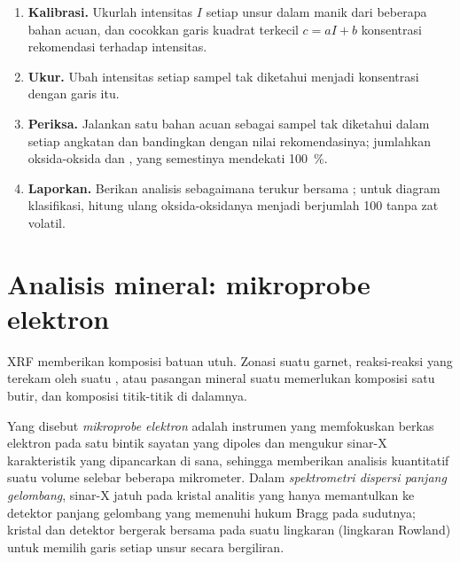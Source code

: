\begin{method}\label{met:b2:field-lab-methods-2:calibration}
\begin{enumerate}
  \item \textbf{Kalibrasi.} Ukurlah intensitas $I$ setiap unsur dalam manik dari beberapa bahan
        acuan, dan cocokkan garis kuadrat terkecil $c = aI + b$ konsentrasi rekomendasi
        terhadap intensitas.
  \item \textbf{Ukur.} Ubah intensitas setiap sampel tak diketahui menjadi konsentrasi dengan garis itu.
  \item \textbf{Periksa.} Jalankan satu bahan acuan sebagai sampel tak diketahui dalam setiap angkatan dan bandingkan dengan
        nilai rekomendasinya; jumlahkan oksida-oksida dan , yang semestinya mendekati
        \qty{100}{\percent}.
  \item \textbf{Laporkan.} Berikan analisis sebagaimana terukur bersama ; untuk
        diagram klasifikasi, hitung ulang oksida-oksidanya menjadi berjumlah 100 tanpa zat volatil.
\end{enumerate}
\end{method}

\section{Analisis mineral: mikroprobe elektron}\label{sec:b2:field-lab-methods-2:microprobe}

XRF memberikan komposisi batuan utuh. Zonasi suatu  garnet, reaksi-reaksi
yang terekam oleh suatu , atau pasangan mineral suatu  memerlukan komposisi satu
butir, dan komposisi titik-titik di dalamnya.

\begin{definition}\label{def:b2:field-lab-methods-2:epma}
Yang disebut \emph{mikroprobe elektron} adalah instrumen yang memfokuskan berkas
elektron pada satu bintik sayatan yang dipoles dan mengukur sinar-X karakteristik yang dipancarkan di sana,
sehingga memberikan analisis kuantitatif suatu volume selebar beberapa mikrometer. Dalam
\emph{spektrometri dispersi panjang gelombang}, sinar-X jatuh
pada kristal analitis yang hanya memantulkan ke detektor panjang gelombang yang memenuhi hukum Bragg pada
sudutnya; kristal dan detektor bergerak bersama pada suatu lingkaran (lingkaran Rowland) untuk memilih garis
setiap unsur secara bergiliran.
\end{definition}

